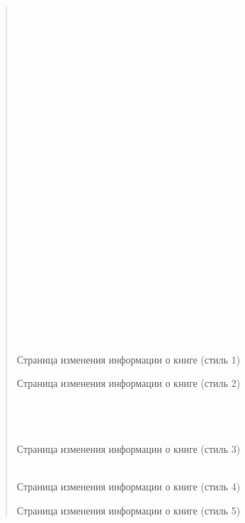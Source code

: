 \documentclass[letterpaper,10pt,russian]{sphinxmanual}
\begin{document}
\begin{quote}
\sphinxAtStartPar
\\
\\
\\
\\
\\
\\
\\
\\
\\
\\
\\
\\
\\
\\
\\
\\
\\
\\
\\
\\
\\
\\
\\
\\
\\

Страница изменения информации о книге (стиль 1)

\noindent{}

\sphinxAtStartPar

Страница изменения информации о книге (стиль 2)

\noindent{}

\sphinxAtStartPar
\\
\\
\\
Страница изменения информации о книге (стиль 3)

\noindent{}

\sphinxAtStartPar
\\
Страница изменения информации о книге (стиль 4)

\noindent{}

\sphinxAtStartPar
Страница изменения информации о книге (стиль 5)

\noindent{}


\end{quote}
\end{document}
